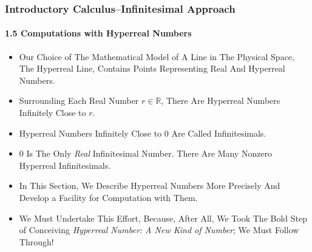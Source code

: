 \begin{frame}
\frametitle{Introductory Calculus--Infinitesimal Approach}
\framesubtitle{1.5 Computations with Hyperreal Numbers}
\label{slide:1.5-01}
\begin{itemize}
\item Our Choice of The Mathematical Model of A Line in The Physical Space, \alert{The Hyperreal Line}, Contains Points Representing Real And Hyperreal Numbers.
\item Surrounding Each Real Number $r\in\mathbb{R}$, There Are \alert{Hyperreal Numbers Infinitely Close to $r$}.
\item Hyperreal Numbers Infinitely Close to 0 Are Called Infinitesimals.
\item $0$ Is The Only \textit{Real} Infinitesimal Number. There Are Many Nonzero Hyperreal Infinitesimals.
\pause\item In This Section, \alert{We Describe Hyperreal Numbers More Precisely And Develop a Facility for Computation with Them}.
\pause\item We Must Undertake This Effort, Because, After All, We Took \alert{The Bold Step of Conceiving \textit{Hyperreal Number: A New Kind of Number}}; We Must Follow Through!
\end{itemize}
\end{frame}
